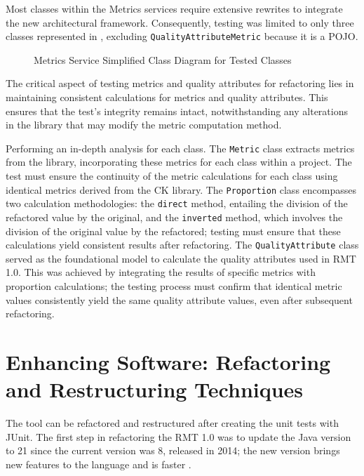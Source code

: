 Most classes within the Metrics services require extensive rewrites to integrate the new architectural framework. Consequently, testing was limited to only three classes represented in , excluding \texttt{QualityAttributeMetric} because it is a POJO.

\begin{figure}[ht!]
\SetCaptionWidth{\textwidth}
\caption{Metrics Service Simplified Class Diagram for Tested Classes}
\label{fig-class-metrics-quality}

\end{figure}
\FloatBarrier

The critical aspect of testing metrics and quality attributes for refactoring lies in maintaining consistent calculations for metrics and quality attributes. This ensures that the test's integrity remains intact, notwithstanding any alterations in the library that may modify the metric computation method.

Performing an in-depth analysis for each class. The \texttt{Metric} class extracts metrics from the \textcite{ck} library, incorporating these metrics for each class within a project. The test must ensure the continuity of the metric calculations for each class using identical metrics derived from the CK library. The \texttt{Proportion} class encompasses two calculation methodologies: the \texttt{direct} method, entailing the division of the refactored value by the original, and the \texttt{inverted} method, which involves the division of the original value by the refactored; testing must ensure that these calculations yield consistent results after refactoring. The \texttt{QualityAttribute} class served as the foundational model to calculate the quality attributes used in RMT 1.0. This was achieved by integrating the results of specific metrics with proportion calculations; the testing process must confirm that identical metric values consistently yield the same quality attribute values, even after subsequent refactoring.

\section{Enhancing Software: Refactoring and Restructuring Techniques}
\label{sec-enhancing}

The tool can be refactored and restructured after creating the unit tests with JUnit. The first step in refactoring the RMT 1.0 was to update the Java version to 21 since the current version was 8, released in 2014; the new version brings new features to the language and is faster \cite{java21}. 


